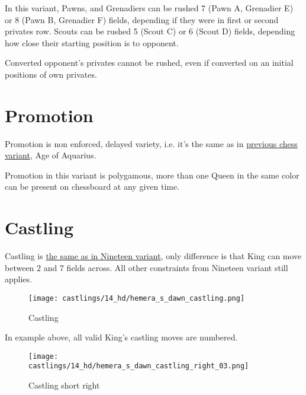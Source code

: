 In this variant, Pawns, and Grenadiers can be rushed 7 (Pawn A, Grenadier E) or 8
(Pawn B, Grenadier F) fields, depending if they were in first or second privates row.
Scouts can be rushed 5 (Scout C) or 6 (Scout D) fields, depending how close their
starting position is to opponent.

Converted opponent's privates cannot be rushed, even if converted on an initial
positions of own privates.


\section*{Promotion}
\label{sec:Hemera's Dawn/Promotion}

Promotion is non enforced, delayed variety, i.e. it's the same as in
\hyperref[sec:Age of Aquarius/Promotion]{previous chess variant}, Age of Aquarius.

Promotion in this variant is polygamous, more than one Queen in the same color
can be present on chessboard at any given time.

\clearpage %

\section*{Castling}
\label{sec:Hemera's Dawn/Castling}

Castling is
\hyperref[sec:Nineteen/Castling]{the same as in Nineteen variant},
only difference is that King can move
between 2 and 7 fields across. All other constraints from Nineteen variant still
applies.

\noindent
\begin{figure}[!h]
\texttt{[image: castlings/14\_hd/hemera\_s\_dawn\_castling.png]}
\caption{Castling}
\label{fig:hemera_s_dawn_castling}
\end{figure}

In example above, all valid King's castling moves are numbered.

\noindent
\begin{figure}[!h]
\texttt{[image: castlings/14\_hd/hemera\_s\_dawn\_castling\_right\_03.png]}
\caption{Castling short right}
\label{fig:hemera_s_dawn_castling_right_03}
\end{figure}

